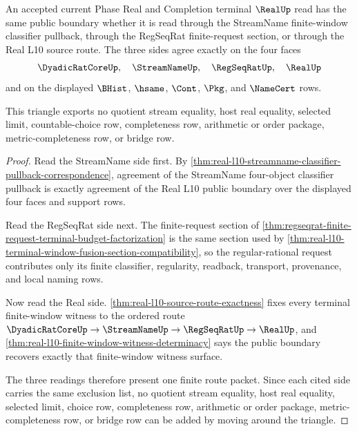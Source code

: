 \begin{theorem}
\label{thm:real-l10-streamname-regseqrat-completion-route-triangle}
An accepted current Phase Real and Completion terminal $\RealUp$ read has the same public boundary whether it is read through the StreamName finite-window classifier pullback, through the RegSeqRat finite-request section, or through the Real L10 source route. The three sides agree exactly on the four faces
$$
\DyadicRatCoreUp,\quad \StreamNameUp,\quad \RegSeqRatUp,\quad \RealUp
$$
and on the displayed $\BHist$, $\hsame$, $\Cont$, $\Pkg$, and $\NameCert$ rows.

This triangle exports no quotient stream equality, host real equality, selected limit, countable-choice row, completeness row, arithmetic or order package, metric-completeness row, or bridge row.
\end{theorem}
\begin{proof}
Read the StreamName side first. By \autoref{thm:real-l10-streamname-classifier-pullback-correspondence}, agreement of the StreamName four-object classifier pullback is exactly agreement of the Real L10 public boundary over the displayed four faces and support rows.

Read the RegSeqRat side next. The finite-request section of \autoref{thm:regseqrat-finite-request-terminal-budget-factorization} is the same section used by \autoref{thm:real-l10-terminal-window-fusion-section-compatibility}, so the regular-rational request contributes only its finite classifier, regularity, readback, transport, provenance, and local naming rows.

Now read the Real side. \autoref{thm:real-l10-source-route-exactness} fixes every terminal finite-window witness to the ordered route $\DyadicRatCoreUp \to \StreamNameUp \to \RegSeqRatUp \to \RealUp$, and \autoref{thm:real-l10-finite-window-witness-determinacy} says the public boundary recovers exactly that finite-window witness surface.

The three readings therefore present one finite route packet. Since each cited side carries the same exclusion list, no quotient stream equality, host real equality, selected limit, choice row, completeness row, arithmetic or order package, metric-completeness row, or bridge row can be added by moving around the triangle.
\end{proof}

